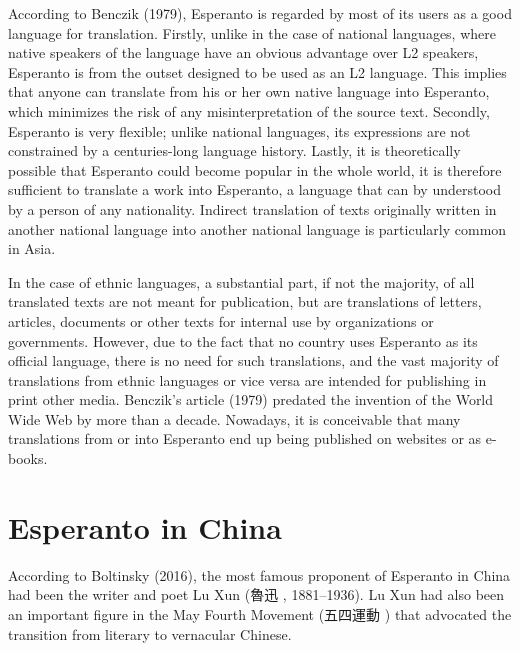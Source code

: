 According to Benczik (1979), Esperanto is regarded by most of its users as a good language for translation.
Firstly, unlike in the case of national languages, where native speakers of the language have an obvious advantage over L2 speakers, Esperanto is from the outset designed to be used as an L2 language.
This implies that anyone can translate from his or her own native language into Esperanto, which minimizes the risk of any misinterpretation of the source text.
Secondly, Esperanto is very flexible; unlike national languages, its expressions are not constrained by a centuries-long language history.
Lastly, it is theoretically possible that Esperanto could become popular in the whole world, it is therefore sufficient to translate a work into Esperanto, a language that can by understood by a person of any nationality.
Indirect translation of texts originally written in another national language into another national language is particularly common in Asia.

In the case of ethnic languages, a substantial part, if not the majority, of all translated texts are not meant for publication, but are translations of letters, articles, documents or other texts for internal use by organizations or governments.
However, due to the fact that no country uses Esperanto as its official language, there is no need for such translations, and the vast majority of translations from ethnic languages or vice versa are intended for publishing in print other media.
Benczik's article (1979) predated the invention of the World Wide Web by more than a decade.
Nowadays, it is conceivable that many translations from or into Esperanto end up being published on websites or as e-books.

\section{Esperanto in China}
According to Boltinsky (2016), the most famous proponent of Esperanto in China had been the writer and poet Lu Xun (魯迅 , 1881--1936).
Lu Xun had also been an important figure in the May Fourth Movement (五四運動 ) that advocated the transition from literary to vernacular Chinese.

